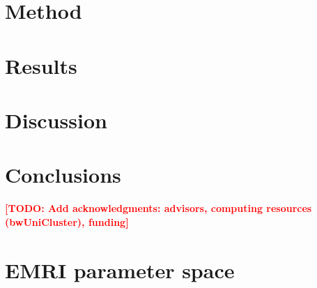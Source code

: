 \documentclass[aps,prd,twocolumn,superscriptaddress,nofootinbib]{revtex4-2}
\newcommand{\todo}[1]{\textcolor{red}{\textbf{[TODO: #1]}}}
\begin{document}


\section{Method}
\label{sec:method}



\section{Results}
\label{sec:results}



\section{Discussion}
\label{sec:discussion}



\section{Conclusions}
\label{sec:conclusions}



\begin{acknowledgments}
\todo{Add acknowledgments: advisors, computing resources (bwUniCluster), funding}
\end{acknowledgments}



\appendix

\section{EMRI parameter space}
\label{app:parameters}


\end{document}
